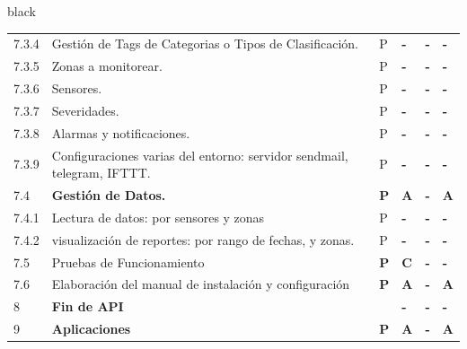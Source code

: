 \documentclass[11pt]{charter}
\begin{document}
\begin{consigna}{black}
\begin{tabularx}{\linewidth}{@{}|p{1.3cm}|p{10cm}|p{3cm}|p{3cm}|p{3cm}|p{3cm}|@{}}
7.3.4                  & Gestión de Tags de Categorias o   Tipos de Clasificación.                                     & P          & \textbf{-} & \textbf{-} & \textbf{-} \\
7.3.5                  & Zonas a monitorear.                                                                           & P          & \textbf{-} & \textbf{-} & \textbf{-} \\
7.3.6                  & Sensores.                                                                                     & P          & \textbf{-} & \textbf{-} & \textbf{-} \\
7.3.7                  & Severidades.                                                                                  & P          & \textbf{-} & \textbf{-} & \textbf{-} \\
7.3.8                  & Alarmas y notificaciones.                                                                     & P          & \textbf{-} & \textbf{-} & \textbf{-} \\
7.3.9                  & Configuraciones varias del   entorno: servidor sendmail, telegram, IFTTT.                     & P          & \textbf{-} & \textbf{-} & \textbf{-} \\
7.4                    & \textbf{Gestión de Datos.}                                                                    & \textbf{P} & \textbf{A} & \textbf{-} & \textbf{A} \\
7.4.1                  & Lectura de datos: por sensores y   zonas                                                      & P          & \textbf{-} & \textbf{-} & \textbf{-} \\
7.4.2                  & visualización de reportes: por   rango de fechas,  y zonas.                                   & P          & \textbf{-} & \textbf{-} & \textbf{-} \\
7.5                    & Pruebas de Funcionamiento                                                                     & \textbf{P} & \textbf{C} & \textbf{-} & \textbf{-} \\
7.6                    & Elaboración del manual de   instalación y configuración                                       & \textbf{P} & \textbf{A} & \textbf{-} & \textbf{A} \\
8                      & \textbf{Fin de API}                                                                           &            & \textbf{-} & \textbf{-} & \textbf{-} \\
9                      & \textbf{Aplicaciones}                                                                         & \textbf{P} & \textbf{A} & \textbf{-} & \textbf{A} \\

\end{tabularx}
\end{consigna}
\end{document}
